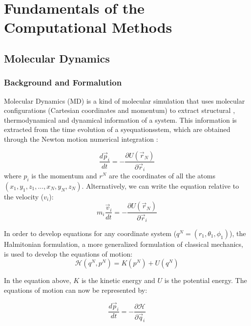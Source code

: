 
\chapter{Fundamentals of the Computational Methods} %

\label{Chapter3} %
\onehalfspace

\section{Molecular Dynamics}

\subsection{Background and Formalution}
Molecular Dynamics (MD) is a kind of molecular simulation that uses molecular configurations (Cartesian coordinates and momentum) to extract structural , thermodynamical and dynamical information of a system. This information is extracted from the time evolution of a syequationsstem, which are obtained  through the Newton motion  numerical integration \cite{tuckerman}:

\begin{equation}
\frac{d \vec{p}_{i}}{dt} = - \frac{\partial U (\vec{r}_{N})}{\partial \vec{r}_{i}}
\end{equation}
where $p_{i}$ is the momentum and $r^{N}$ are the coordinates of all the atoms$(x_{1},y_{1},z_{1},...,x_{N},y_{N},z_{N})$. Alternatively, we can write the equation relative to the velocity ($v_{i}$):
\begin{equation}
m_{i} \frac{\vec{v}_{i}}{dt} = - \frac{\partial U (\vec{r}_{N})}{\partial \vec{r}_{i}}
\end{equation}

In order to develop equations for any coordinate system ($q^{N}=(r_{1},\theta _{1},\phi _{1})$), the Halmitonian formulation, a more generalized formulation of classical mechanics,  is used to develop the equations of motion:
\begin{equation}
\mathcal{H} (q^{N},p^{N}) = K(p^{N}) + U(q^{N}) 
\end{equation}

In the equation above, $K$ is the kinetic energy and $U$ is the potential energy. The equations of motion can now be represented by:

\begin{equation}
\frac{d \vec{p}_{i}}{dt} = - \frac{\partial \mathcal{H}}{\partial \vec{q}_{i}}
\end{equation}

